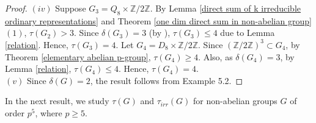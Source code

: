 \documentclass[a4paper,11pt]{amsart}
\numberwithin{equation}{section}
\numberwithin{equation}{subsection}
\newcommand{\Z}{\mathbb{Z}}
\newcommand{\dg}{\delta(G)}
\newcommand{\poonam}[1]{{\color{blue} #1}}
\begin{document}
\begin{proof}
$(iv)$ Suppose $G_3 = Q_{8} \times \Z/2\Z$. By Lemma \ref{direct sum of k irreducible ordinary representations} and Theorem \ref{one dim direct sum in non-abelian group}$(1)$, $\tau(G_2) > 3$.  Since $\delta(G_3)= 3$ (by \cite[Theorem 3.1(3)]{kaur}), $\tau(G_3) \leq 4$ due to Lemma \ref{relation}. Hence, $\tau(G_3)= 4$.  
Let $G_4 = D_{8} \times \mathbb{Z}/2\mathbb{Z}$. Since $(\Z/2\Z)^3 \subset G_4$, by Theorem \ref{elementary abelian p-group}, $\tau(G_4) \geqslant 4$. Also, as $\delta(G_4)= 3$, by Lemma \ref{relation}, $\tau(G_4) \leq 4$. Hence, $\tau(G_4)= 4$. \\  %

$(v)$ %
Since $\delta(G)= 2$, the result follows from Example 5.2.

\end{proof}

In the next result, we study $\tau(G)$ and $\tau_{irr}(G)$ for non-abelian groups $G$ of order $p^5$, where $p \geq 5$.
\end{document}
